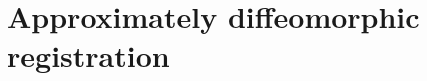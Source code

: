 \documentclass[10pt,twocolumn,letterpaper]{article} %
\begin{document}



%

\section{Approximately diffeomorphic registration}
\end{document}
